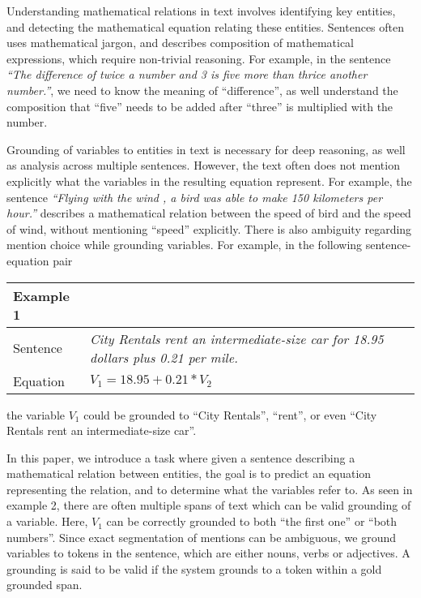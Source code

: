   Understanding mathematical relations in text involves identifying
  key entities, and detecting the mathematical equation relating these
  entities. Sentences often uses mathematical jargon, and describes
  composition of mathematical expressions, which require non-trivial
  reasoning. For example, in the sentence {\em``The difference of twice a
  number and 3 is five more than thrice another number.''}, we need to
  know the meaning of ``difference'', as well understand the
  composition that ``five'' needs to be added after ``three'' is
  multiplied with the number.

  Grounding of variables to entities in text is necessary for deep
  reasoning, as well as analysis across multiple sentences. However,
  the text often does not mention explicitly what the variables in the
  resulting equation represent. For example, the sentence {\em``Flying
  with the wind , a bird was able to make 150 kilometers per hour.''}
  describes a mathematical relation between the speed of bird and the
  speed of wind, without mentioning ``speed'' explicitly. There is
  also ambiguity regarding mention choice while grounding
  variables. For example, in the following sentence-equation pair

  \setlength{\tabcolsep}{6pt}
  \begin{table}[H]
   \centering \small
   \begin{tabular}{|lp{5cm}|}
     \hline Example 1 &  \\
     \hline Sentence & {\em City Rentals rent an intermediate-size car
  for 18.95 dollars plus 0.21 per mile.} \\
     \hline Equation & $V_1=18.95+0.21*V_2$ \\
     \hline 
   \end{tabular}
   \label{tab:example1}
  \end{table}
  
  \noindent the variable $V_1$ could be grounded to ``City Rentals'',
  ``rent'', or even ``City Rentals rent an intermediate-size car''.

  In this paper, we introduce a task where given a sentence describing
  a mathematical relation between entities, the goal is to predict an
  equation representing the relation, and to determine what the
  variables refer to. As seen in example 2, there are often multiple
  spans of text which can be valid grounding of a variable. Here,
  $V_1$ can be correctly grounded to both ``the first one'' or ``both
  numbers''. Since exact segmentation of mentions can be ambiguous, we
  ground variables to tokens in the sentence, which are either nouns,
  verbs or adjectives. A grounding is said to be valid if the system
  grounds to a token within a gold grounded span.
  
